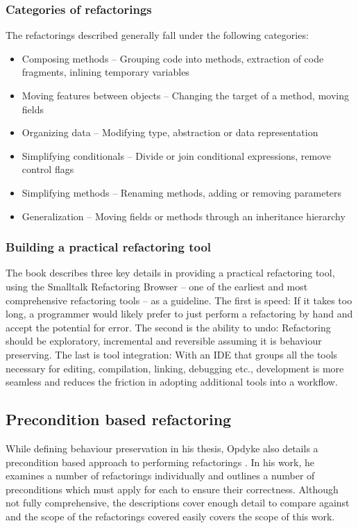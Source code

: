 \subsubsection{Categories of refactorings}
The refactorings described generally fall under the following categories:
\begin{itemize}
\item Composing methods -- Grouping code into methods, extraction of code fragments, inlining temporary variables
\item Moving features between objects -- Changing the target of a method, moving fields
\item Organizing data -- Modifying type, abstraction or data representation
\item Simplifying conditionals -- Divide or join conditional expressions, remove control flags
\item Simplifying methods -- Renaming methods, adding or removing parameters
\item Generalization -- Moving fields or methods through an inheritance hierarchy
\end{itemize}

\subsubsection{Building a practical refactoring tool}
The book describes three key details in providing a practical refactoring tool, using the Smalltalk Refactoring Browser -- one of the earliest and most comprehensive refactoring tools -- as a guideline. The first is speed: If it takes too long, a programmer would likely prefer to just perform a refactoring by hand and accept the potential for error. The second is the ability to undo: Refactoring should be exploratory, incremental and reversible assuming it is behaviour preserving. The last is tool integration: With an IDE that groups all the tools necessary for editing, compilation, linking, debugging etc., development is more seamless and reduces the friction in adopting additional tools into a workflow. 




\subsection{Precondition based refactoring}
While defining behaviour preservation  in his thesis, Opdyke also details a precondition based approach to performing refactorings \cite{opdyke1992refactoring}. In his work, he examines a number of refactorings individually and outlines a number of preconditions which must apply for each to ensure their correctness. Although not fully comprehensive, the descriptions cover enough detail to compare against and the scope of the refactorings covered easily covers the scope of this work.

